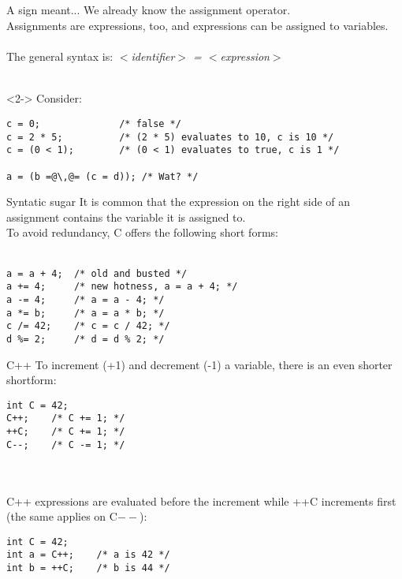 \subsection{}
\begin{frame}[fragile]{A sign meant...}
	We already know the assignment operator.\\
	Assignments are expressions, too, and expressions can be assigned to variables.\\\ \\
	The general syntax is:	\textit{$<$identifier$>$ = $<$expression$>$}\\\ \\
	
	\begin{uncoverenv}<2->
		Consider:
		\begin{lstlisting}[numbers=none]
c = 0;				/* false */
c = 2 * 5;			/* (2 * 5) evaluates to 10, c is 10 */
c = (0 < 1);		/* (0 < 1) evaluates to true, c is 1 */

a = (b =@\,@= (c = d));	/* Wat? */
\end{lstlisting}
	\end{uncoverenv}
\end{frame}
\begin{frame}[fragile]{Syntatic sugar}
	It is common that the expression on the right side of an assignment contains the variable it is assigned to.\\
	To avoid redundancy, C offers the following short forms:\\\ \\
	\begin{lstlisting}[numbers=none]
a = a + 4;	/* old and busted */
a += 4;		/* new hotness, a = a + 4; */
a -= 4;		/* a = a - 4; */
a *= b;		/* a = a * b; */
c /= 42;	/* c = c / 42; */
d %= 2;		/* d = d % 2; */
\end{lstlisting}
\end{frame}
\begin{frame}[fragile]{C++}
	To increment (+1) and decrement (-1) a variable, there is an even shorter shortform:
	\begin{lstlisting}[numbers=none]
int C = 42;
C++;	/* C += 1; */
++C;	/* C += 1; */
C--;	/* C -= 1; */
\end{lstlisting}
\ \\\ \\C++ expressions are evaluated before the increment while ++C increments first (the same applies on C$--$):
	\begin{lstlisting}[numbers=none]
int C = 42;
int a = C++;	/* a is 42 */
int b = ++C;	/* b is 44 */
\end{lstlisting}
\end{frame}


